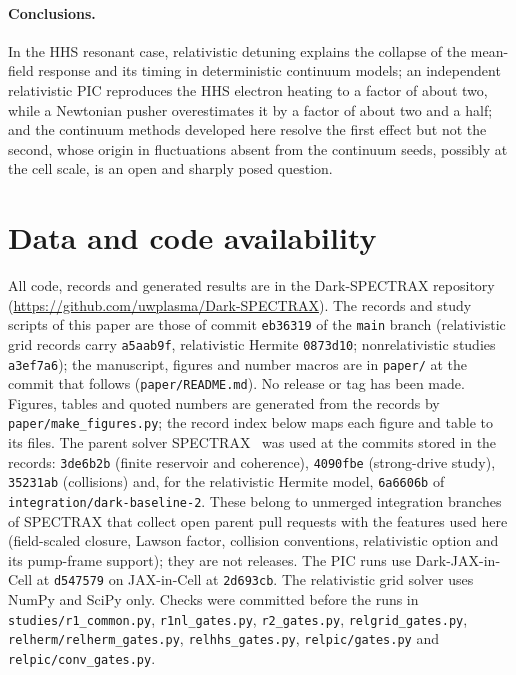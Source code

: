 \documentclass[aps,pre,reprint,floatfix,amsmath,amssymb,nofootinbib,superscriptaddress]{revtex4-2}
\begin{document}
\paragraph*{Conclusions.} In the HHS resonant case, relativistic detuning explains the collapse of the mean-field response and its timing in deterministic continuum models; an independent relativistic PIC reproduces the HHS electron heating to a factor of about two, while a Newtonian pusher overestimates it by a factor of about two and a half; and the continuum methods developed here resolve the first effect but not the second, whose origin in fluctuations absent from the continuum seeds, possibly at the cell scale, is an open and sharply posed question.

\section*{Data and code availability}
All code, records and generated results are in the Dark-SPECTRAX repository~\cite{DarkSPECTRAX} (\url{https://github.com/uwplasma/Dark-SPECTRAX}). The records and study scripts of this paper are those of commit \texttt{eb36319} of the \texttt{main} branch (relativistic grid records carry \texttt{a5aab9f}, relativistic Hermite \texttt{0873d10}; nonrelativistic studies \texttt{a3ef7a6}); the manuscript, figures and number macros are in \texttt{paper/} at the commit that follows (\texttt{paper/README.md}). No release or tag has been made. Figures, tables and quoted numbers are generated from the records by \texttt{paper/make\_figures.py}; the record index below maps each figure and table to its files. The parent solver SPECTRAX~\cite{SPECTRAX} was used at the commits stored in the records: \texttt{3de6b2b} (finite reservoir and coherence), \texttt{4090fbe} (strong-drive study), \texttt{35231ab} (collisions) and, for the relativistic Hermite model, \texttt{6a6606b} of \texttt{integration/dark-baseline-2}. These belong to unmerged integration branches of SPECTRAX that collect open parent pull requests with the features used here (field-scaled closure, Lawson factor, collision conventions, relativistic option and its pump-frame support); they are not releases. The PIC runs use Dark-JAX-in-Cell at \texttt{d547579} on JAX-in-Cell at \texttt{2d693cb}. The relativistic grid solver uses NumPy and SciPy only. Checks were committed before the runs in \texttt{studies/r1\_common.py}, \texttt{r1nl\_gates.py}, \texttt{r2\_gates.py}, \texttt{relgrid\_gates.py}, \texttt{relherm/relherm\_gates.py}, \texttt{relhhs\_gates.py}, \texttt{relpic/gates.py} and \texttt{relpic/conv\_gates.py}.
\end{document}
